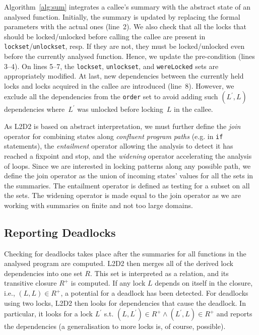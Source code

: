 \documentclass[runningheads]{llncs}
\newcommand{\LLDD}{\textsc{L2D2}\xspace} %
\begin{document}
Algorithm~\ref{alg:sum} integrates a callee's summary with the abstract
state of an analysed function. Initially, the summary is updated by
replacing the formal parameters with the actual ones (line~2). We also
check that all the locks that should be locked/unlocked before calling the
callee are present in \texttt{lockset}/\texttt{unlockset}, resp. If they
are not, they must be locked/unlocked even before the currently analysed
function. Hence, we update the pre-condition (lines 3--4). On lines 5--7,
the \texttt{lockset}, \texttt{unlockset}, and \texttt{wereLocked} sets are
appropriately modified. At last, new dependencies between the currently
held locks and locks acquired in the callee are introduced (line~8).
However, we exclude all the dependencies from the \texttt{order} set to
avoid adding such $ (L^\prime, L) $ dependencies where~$ L^\prime $ was
unlocked before locking~$ L $ in the callee.

As \LLDD is based on abstract interpretation, we must further define the
\emph{join} operator for combining states along \emph{confluent program paths}
(e.g. in \texttt{if} statements), the \emph{entailment} operator allowing the
analysis to detect it has reached a fixpoint and stop, and the \emph{widening}
operator accelerating the analysis of loops. Since we are interested in locking
patterns along any possible path, we define the join operator as the union of
incoming states' values for all the sets in the summaries. The entailment
operator is defined as testing for a subset on all the sets. The widening
operator is made equal to the join operator as we are working with summaries on
finite and not too large domains.

\vspace*{-4mm}\subsection{Reporting Deadlocks}\vspace*{-2mm}

Checking for deadlocks takes place after the summaries for all functions in the
analysed program are computed. \LLDD then merges all of the derived lock
dependencies into one set $R$. This set is interpreted as a relation, and its
transitive closure $R^+$ is computed. If any lock $L$ depends on itself in the
closure, i.e., $(L, L) \in R^+$, a potential for a deadlock has been detected.
%
For deadlocks using two locks, \LLDD then looks for dependencies that cause the
deadlock. In particular, it looks for a lock $ L^\prime$ s.t. $(L, L^\prime) \in
R^+ \wedge (L^\prime, L) \in R^+ $ and reports the dependencies (a
generalisation to more locks is, of course, possible).
\end{document}
